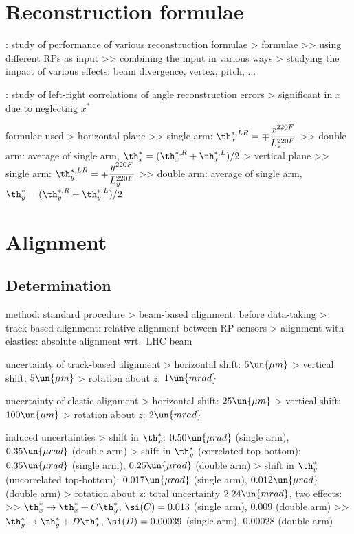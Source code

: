 \chapter{Reconstruction formulae}

\>  : study of performance of various reconstruction formulae
\>> formulae
\>>> using different RPs as input
\>>> combining the input in various ways
\>> studying the impact of various effects: beam divergence, vertex, pitch, ...

\>  : study of left-right correlations of angle reconstruction errors
\>> significant in $x$ due to neglecting $x^*$

\> formulae used
\>> horizontal plane
\>>> single arm: $\displaystyle \th_x^{*,LR} = \mp {x^{220F}\over L_x^{220F}}$
\>>> double arm: average of single arm, $\th_x^* = (\th_x^{*,R} + \th_x^{*,L}) / 2$
\>> vertical plane
\>>> single arm: $\displaystyle \th_y^{*,LR} = \mp {y^{220F}\over L_y^{220F}}$
\>>> double arm: average of single arm, $\th_y^* = (\th_y^{*,R} + \th_y^{*,L}) / 2$


\chapter[alignment]{Alignment}

\section[alignment-det]{Determination}

\> method: standard procedure
\>> beam-based alignment: before data-taking
\>> track-based alignment: relative alignment between RP sensors
\>> alignment with elastics: absolute alignment wrt.~LHC beam

\> uncertainty of track-based alignment
\>> horizontal shift: $5\un{\mu m}$
\>> vertical shift: $5\un{\mu m}$
\>> rotation about $z$: $1\un{mrad}$

\> uncertainty of elastic alignment
\>> horizontal shift: $25\un{\mu m}$
\>> vertical shift: $100\un{\mu m}$
\>> rotation about $z$: $2\un{mrad}$

\> induced uncertainties
\>> shift in $\th_x^*$: $0.50\un{\mu rad}$ (single arm), $0.35\un{\mu rad}$ (double arm)
\>> shift in $\th_y^*$ (correlated top-bottom): $0.35\un{\mu rad}$ (single arm), $0.25\un{\mu rad}$ (double arm)
\>> shift in $\th_y^*$ (uncorrelated top-bottom): $0.017\un{\mu rad}$ (single arm), $0.012\un{\mu rad}$ (double arm)
\>> rotation about z: total uncertainty $2.24\un{mrad}$, two effects:
\>>> $\th_x^* \rightarrow \th_x^* + C \th_y^*$, $\si(C) = 0.013$ (single arm), $0.009$ (double arm)
\>>> $\th_y^* \rightarrow \th_y^* + D \th_x^*$, $\si(D) = 0.00039$ (single arm), $0.00028$ (double arm)

